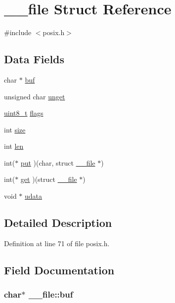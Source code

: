 \hypertarget{struct____file}{\section{\-\_\-\-\_\-file Struct Reference}
\label{struct____file}
}


{\ttfamily \#include $<$posix.\-h$>$}

\subsection*{Data Fields}
\begin{DoxyCompactItemize}
\item 
char $\ast$ \hyperlink{struct____file_a3e5a85ae919a90efbb7cb44ccb54fe46}{buf}
\item 
unsigned char \hyperlink{struct____file_a1d139ae3cb11a1fada469a49f7d3d3b6}{unget}
\item 
\hyperlink{send_8c_aba7bc1797add20fe3efdf37ced1182c5}{uint8\-\_\-t} \hyperlink{struct____file_a8d11df8679502efee09740f97d7c277b}{flags}
\item 
int \hyperlink{struct____file_aff4a1ca8b6a12460812928afae81248d}{size}
\item 
int \hyperlink{struct____file_a30309efd13a75ed510bb2370debafaf8}{len}
\item 
int($\ast$ \hyperlink{struct____file_ac30baaec720d36ed503f35ae50bcec13}{put} )(char, struct \hyperlink{struct____file}{\-\_\-\-\_\-file} $\ast$)
\item 
int($\ast$ \hyperlink{struct____file_a467262b28adfee5f6fb6df42de293071}{get} )(struct \hyperlink{struct____file}{\-\_\-\-\_\-file} $\ast$)
\item 
void $\ast$ \hyperlink{struct____file_abe6f3bdb4df4119277132eb3e13a4628}{udata}
\end{DoxyCompactItemize}


\subsection{Detailed Description}


Definition at line 71 of file posix.\-h.



\subsection{Field Documentation}
\hypertarget{struct____file_a3e5a85ae919a90efbb7cb44ccb54fe46}{
\subsubsection[{buf}]{\setlength{\rightskip}{0pt plus 5cm}char$\ast$ \-\_\-\-\_\-file\-::buf}}\label{struct____file_a3e5a85ae919a90efbb7cb44ccb54fe46}


